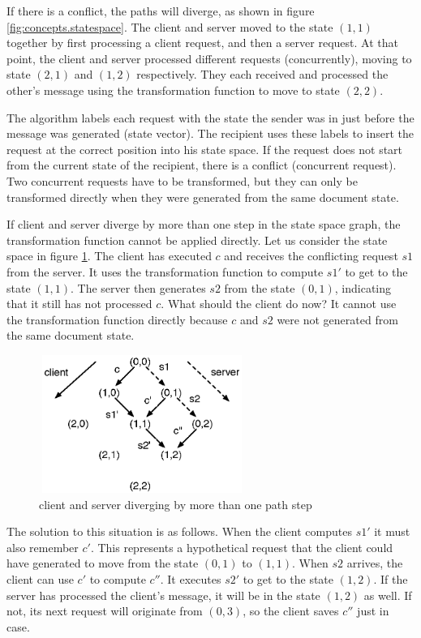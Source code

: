If there is a conflict, the paths will diverge, as shown in figure \ref{fig:concepts.statespace}. The client and server moved to the state $(1,1)$ together by first processing a client request, and then a server request. At that point, the client and server processed different requests (concurrently), moving to state $(2,1)$ and $(1,2)$ respectively. They each received and processed the other's message using the transformation function to move to state $(2,2)$.

The algorithm labels each request with the state the sender was in just before the message was generated (state vector). The recipient uses these labels to insert the request at the correct position into his state space. If the request does not start from the current state of the recipient, there is a conflict (concurrent request). Two concurrent requests have to be transformed, but they can only be transformed directly when they were generated from the same document state.

If client and server diverge by more than one step in the state space graph, the transformation function cannot be applied directly. Let us consider the state space in figure \ref{fig:concepts.statespace2}. The client has executed $c$ and receives the conflicting request $s1$ from the server. It uses the transformation function to compute $s1'$ to get to the state $(1,1)$. The server then generates $s2$ from the state $(0,1)$, indicating that it still has not processed $c$. What should the client do now? It cannot use the transformation function directly because $c$ and $s2$ were not generated from the same document state.

\begin{figure}[htb]
 \centering
 \includegraphics[width=6.71cm,height=4.5cm]{../../images/concepts_statespace2.eps}
 \caption{client and server diverging by more than one path step}
 \label{fig:concepts.statespace2}
\end{figure}

The solution to this situation is as follows. When the client computes $s1'$ it must also remember $c'$. This represents a hypothetical request that the client could have generated to move from the state $(0,1)$ to $(1,1)$. When $s2$ arrives, the client can use $c'$ to compute $c''$. It executes $s2'$ to get to the state $(1,2)$. If the server has processed the client's message, it will be in the state $(1,2)$ as well. If not, its next request will originate from $(0,3)$, so the client saves $c''$ just in case.

